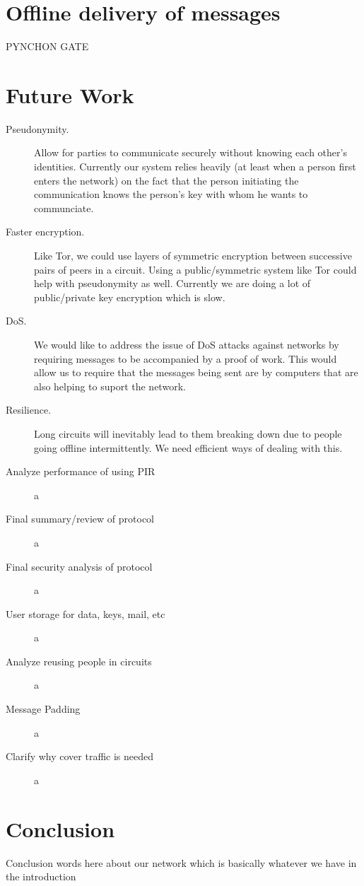 \documentclass[twocolumn,11pt,english]{article}
\begin{document}
\section{Offline delivery of messages}
 PYNCHON GATE

\section{Future Work}
\begin{description}
\item[Pseudonymity.] Allow for parties to communicate securely without knowing each other's identities. Currently our system relies heavily (at least when a person first enters the network) on the fact that the person initiating the communication knows the person's key with whom he wants to communciate.

\item[Faster encryption.] Like Tor, we could use layers of symmetric encryption between successive pairs of peers in a circuit. Using a public/symmetric system like Tor could help with pseudonymity as well. Currently we are doing a lot of public/private key encryption which is slow.

\item[DoS.] We would like to address the issue of DoS attacks against networks by requiring messages to be accompanied by a proof of work. This would allow us to require that the messages being sent are by computers that are also helping to suport the network.

\item[Resilience.] Long circuits will inevitably lead to them breaking down due to people going offline intermittently. We need efficient ways of dealing with this. 


\item[Analyze performance of using PIR] a

\item[Final summary/review of protocol]a

\item[Final security analysis of protocol]a

\item[User storage for data, keys, mail, etc]a

\item[Analyze reusing people in circuits]a

\item[Message Padding]a

\item[Clarify why cover traffic is needed]a
\end{description}
\section{Conclusion}
Conclusion words here about our network which is basically whatever we have in the introduction

\newpage



\end{document}
